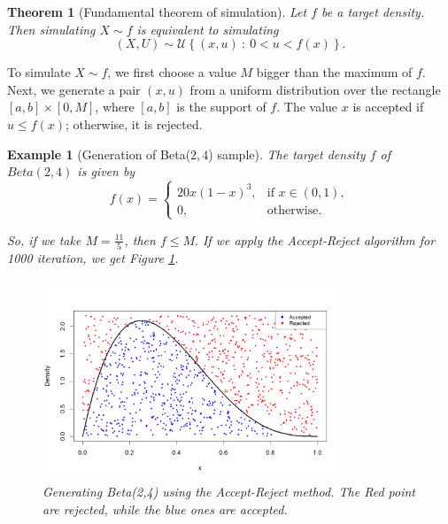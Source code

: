 \documentclass{article}\usepackage[]{graphicx}\usepackage[]{xcolor}
\newtheorem{example}{Example}
\newtheorem{theorem}{Theorem}
\begin{document}
\begin{theorem}[Fundamental theorem of simulation]\label{Fundamental theorem of simulation}
Let $f$ be a target density. Then simulating $X\sim f$ is equivalent to simulating 
\begin{equation}\label{Fund thm of sim eq}
\left(X, U\right) \sim \mathcal{U}\left\{(x,u)~:~0< u < f(x)\right\}.
\end{equation}

\end{theorem}

To simulate $X \sim f$, we first choose a value $M$ bigger than the maximum of $f$. Next, we generate a pair $(x, u)$ from a uniform distribution over the rectangle $[a, b] \times [0, M]$, where $[a,b]$ is the support of $f$. The value $x$ is accepted if $u \leq f(x)$; otherwise, it is rejected.



\begin{example}[Generation of Beta($2,4$) sample] The target density $f$ of $Beta(2,4)$ is given by 
\begin{equation}\label{Target_density_Beta}
f(x) =
\begin{cases} 
20 x(1-x)^3, & \text{if } x \in (0,1), \\ 
0, & \text{otherwise}.
\end{cases}
\end{equation}

So, if we take $M=\frac{11}{5}$, then $f\leq M.$ If we apply the Accept-Reject algorithm  for 1000 iteration, we get Figure \ref{fig:GeneratingBetaDistr}.

\begin{figure}[h]
    \centering
    \includegraphics[width=0.8\textwidth]{Figures/Accept-Reject generation of a Beta sample.png}
    \caption{Generating Beta(2,4) using the Accept-Reject method. The Red point are rejected, while the blue ones are accepted.}
    \label{fig:GeneratingBetaDistr}
\end{figure}

\end{example}
\end{document}
